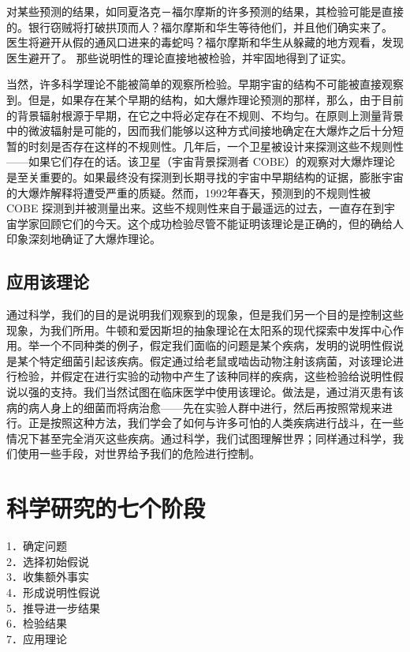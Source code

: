 对某些预测的结果，如同夏洛克－福尔摩斯的许多预测的结果，其检验可能是直接的。银行窃贼将打破拱顶而人？福尔摩斯和华生等待他们，并且他们确实来了。\cite{doyle1927} 医生将避开从假的通风口进来的毒蛇吗？福尔摩斯和华生从躲藏的地方观看，发现医生避开了。\cite{doyle1927b} 那些说明性的理论直接地被检验，并牢固地得到了证实。

当然，许多科学理论不能被简单的观察所检验。早期宇宙的结构不可能被直接观察到。但是，如果存在某个早期的结构，如大爆炸理论预测的那样，那么，由于目前的背景辐射根源于早期，在它之中将必定存在不规则、不均匀。在原则上测量背景中的微波辐射是可能的，因而我们能够以这种方式间接地确定在大爆炸之后十分短暂的时刻是否存在这样的不规则性。几年后，一个卫星被设计来探测这些不规则性——如果它们存在的话。该卫星（宇宙背景探测者 COBE）的观察对大爆炸理论是至关重要的。如果最终没有探测到长期寻找的宇宙中早期结构的证据，膨胀宇宙的大爆炸解释将遭受严重的质疑。然而，1992年春天，预测到的不规则性被 COBE 探测到并被测量出来。这些不规则性来自于最遥远的过去，一直存在到宇宙学家回顾它们的今天。这个成功检验尽管不能证明该理论是正确的，但的确给人印象深刻地确证了大爆炸理论。

\subsection{应用该理论}
通过科学，我们的目的是说明我们观察到的现象，但是我们另一个目的是控制这些现象，为我们所用。牛顿和爱因斯坦的抽象理论在太阳系的现代探索中发挥中心作用。举一个不同种类的例子，假定我们面临的问题是某个疾病，发明的说明性假说是某个特定细菌引起该疾病。假定通过给老鼠或啮齿动物注射该病菌，对该理论进行检验，并假定在进行实验的动物中产生了该种同样的疾病，这些检验给说明性假说以强的支持。我们当然试图在临床医学中使用该理论。做法是，通过消灭患有该病的病人身上的细菌而将病治愈——先在实验人群中进行，然后再按照常规来进行。正是按照这种方法，我们学会了如何与许多可怕的人类疾病进行战斗，在一些情况下甚至完全消灭这些疾病。通过科学，我们试图理解世界；同样通过科学，我们使用一些手段，对世界给予我们的危险进行控制。

\section{科学研究的七个阶段}
1．确定问题\\
2．选择初始假说\\
3．收集额外事实\\
4．形成说明性假说\\
5．推导进一步结果\\
6．检验结果\\
7．应用理论

